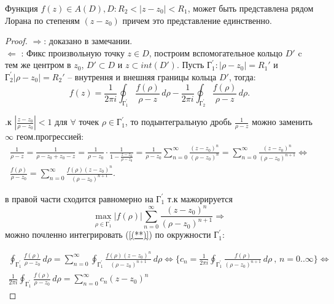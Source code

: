 \begin{theorem}
    Функция $f(z)\in A(D), D: R_2<|z-z_0|<R_1$, может быть представлена рядом Лорана по степеням $(z-z_0)$ причем это представление единственно.
\end{theorem}
\begin{proof}
$\Longrightarrow$: доказано в замечании.\\
$\Longleftarrow$ : Фикс произвольную точку $z \in D$, построим вспомогательное кольцо $D'$ c тем же центром в $z_0$, $D' \subset D$ и $z \subset int(D')$. Пусть $\text{Г}_1^{'}: |\rho - z_0|=R_1'$ и $\text{Г}_2^{'}|\rho - z_0|=R_2'$ -- внутрення и внешняя границы кольца $D'$, тогда: 
\begin{equation}
    f(z) = \frac{1}{2\pi i} \oint_{ \text{Г}_1^{'}} \frac{f(\rho)}{\rho - z} \,d\rho - \frac{1}{2\pi i} \oint_{ \text{Г}_2^{'}} \frac{f(\rho)}{\rho - z} \,d\rho.
    \label{(*)}
\end{equation}

.к $|\frac{z-z_0}{\rho-z_0}|<1$ для $\forall$ точек $\rho \in \text{Г}_1^{'}$, то подынтегральную дробь $\frac{1}{\rho-z}$ можно заменить $\infty$ геом.прогрессией:
\begin{equation}
\begin{gathered}
   \frac{1}{\rho-z} = \frac{1}{\rho-z_0+z_0-z}=\frac{1}{\rho-z_0}\cdot\frac{1}{1-\frac{z-z_0}{\rho-z_0}} = \frac{1}{\rho-z_0}\sum_{n=0}^{\infty}\frac{(z-z_0)^n}{(\rho-z_0)^n} = \sum_{n=0}^{\infty}\frac{(z-z_0)^n}{(\rho-z_0)^{n+1}} \Longleftrightarrow 
   \\
   \frac{f(\rho)}{\rho-z_0}=\sum_{n=0}^{\infty}\frac{f(\rho)(z-z_0)^n}{(\rho-z_0)^{n+1}}.
\end{gathered}
    \label{(**)}
\end{equation}


 в правой части сходится равномерно на $\text{Г}_1^{'}$ т.к мажорируется $$\max_{\rho \in \text{Г}_1^{'}}|f(\rho)|\sum_{n=0}^{\infty}\frac{(z-z_0)^n}{(\rho-z_0)^{n+1}} \Rightarrow$$ можно почленно интегрировать (\ref{(**)}) по окружности $\text{Г}_1^{'}$:

\begin{equation}
\begin{gathered}
    \oint_{ \text{Г}_1^{'}}\frac{f(\rho)}{\rho-z_0} \,d\rho =\sum_{n=0}^{\infty} \oint_{ \text{Г}_1^{'}} \frac{f(\rho)(z-z_0)^n}{(\rho-z_0)^{n+1}} \,d\rho \Longleftrightarrow \{ c_n = \frac{1}{2\pi i} \oint_{ \text{Г}_1^{'}} \frac{f(\rho)}{(\rho-z_0)^{n+1}} \,d\rho\ \text{, }n=0..\infty\}\Longleftrightarrow 
    \\
    \frac{1}{2\pi i}\oint_{ \text{Г}_1^{'}}\frac{f(\rho)}{\rho-z_0} \,d\rho = \sum_{n=0}^{\infty}c_n(z-z_0)^n
\end{gathered}
    \label{(****)}
\end{equation}




\end{proof}

